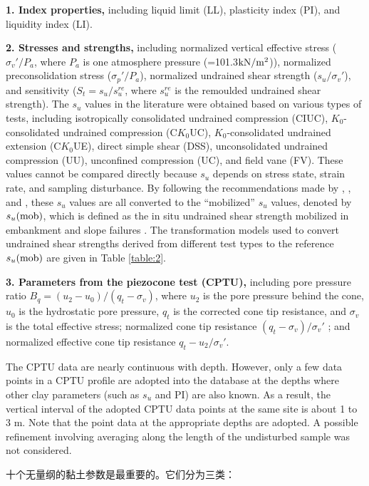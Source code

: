 \begin{Parallel}{0.60\textwidth}{}
{        \textbf{1. Index properties,} including liquid limit (LL), plasticity index (PI), and liquidity index (LI). 

        \textbf{2. Stresses and strengths,} including normalized vertical effective stress ($\sigma_v'/P_a$, where $P_a$ is one atmosphere pressure (=101.3$\rm{kN/m^2}$)), normalized preconsolidation stress ($\sigma_p'/P_a$), normalized undrained shear strength ($s_u/\sigma_v'$), and sensitivity ($S_t=s_u/s_u^{re}$, where $s_u^{re}$ is the remoulded undrained shear strength). The $s_u$ values in the literature were obtained based on various types of tests, including isotropically consolidated undrained compression (CIUC), $K_0$-consolidated undrained compression (C$K_0$UC), $K_0$-consolidated undrained extension (C$K_0$UE), direct simple shear (DSS), unconsolidated undrained compression (UU), unconfined compression (UC), and field vane (FV). These values cannot be compared directly because $s_u$ depends on stress state, strain rate, and sampling disturbance. By following the recommendations made by \citet{Bjerrum19721}, \citet{Kulhawy1990}, and \citet{Mesri20071}, these $s_u$ values are all converted to the “mobilized” $s_u$ values, denoted by $s_u(\rm{mob})$, which is defined as the in situ undrained shear strength mobilized in embankment and slope failures \citep{Mesri20071}. The transformation models used to convert undrained shear strengths derived from different test types to the reference $s_u(\rm{mob})$ are given in Table \ref{table:2}. 

        \textbf{3. Parameters from the piezocone test (CPTU),} including pore pressure ratio $B_q=(u_2-u_0)/(q_t-\sigma_v)$, where $u_2$ is the pore pressure behind the cone, $u_0$ is the hydrostatic pore pressure, $q_t$ is the corrected cone tip resistance, and $\sigma_v$ is the total effective stress; normalized cone tip resistance $(q_t-\sigma_v)/\sigma_v'$ ; and normalized effective cone tip resistance $q_t-u_2/\sigma_v'$. \par
        The CPTU data are nearly continuous with depth. However, only a few data points in a CPTU profile are adopted into the database at the depths where other clay parameters (such as $s_u$ and PI) are also known. As a result, the vertical interval of the adopted CPTU data points at the same site is about 1 to 3 m. Note that the point data at the appropriate depths are adopted. A possible refinement involving averaging along the length of the undisturbed sample was not considered.
    }
    \ParallelRText
    {
        十个无量纲的黏土参数是最重要的。它们分为三类：

}
\end{Parallel}
